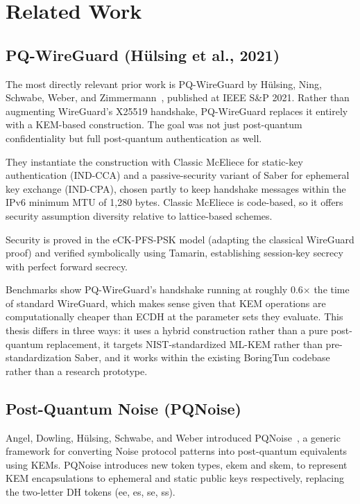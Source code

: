 \chapter{Related Work}
\label{chap:related_work}

\section{PQ-WireGuard (Hülsing et al., 2021)}

The most directly relevant prior work is PQ-WireGuard by Hülsing, Ning, Schwabe, Weber, and Zimmermann~\cite{hulsing2021pqwireguard}, published at IEEE S\&P 2021. Rather than augmenting WireGuard's X25519 handshake, PQ-WireGuard replaces it entirely with a KEM-based construction. The goal was not just post-quantum confidentiality but full post-quantum authentication as well.

They instantiate the construction with Classic McEliece for static-key authentication (IND-CCA) and a passive-security variant of Saber for ephemeral key exchange (IND-CPA), chosen partly to keep handshake messages within the IPv6 minimum MTU of 1,280 bytes. Classic McEliece is code-based, so it offers security assumption diversity relative to lattice-based schemes.

Security is proved in the eCK-PFS-PSK model (adapting the classical WireGuard proof) and verified symbolically using Tamarin, establishing session-key secrecy with perfect forward secrecy.

Benchmarks show PQ-WireGuard's handshake running at roughly 0.6$\times$ the time of standard WireGuard, which makes sense given that KEM operations are computationally cheaper than ECDH at the parameter sets they evaluate. This thesis differs in three ways: it uses a hybrid construction rather than a pure post-quantum replacement, it targets NIST-standardized ML-KEM rather than pre-standardization Saber, and it works within the existing BoringTun codebase rather than a research prototype.

\section{Post-Quantum Noise (PQNoise)}

Angel, Dowling, Hülsing, Schwabe, and Weber introduced PQNoise~\cite{pqnoise2022}, a generic framework for converting Noise protocol patterns into post-quantum equivalents using KEMs. PQNoise introduces new token types, ekem and skem, to represent KEM encapsulations to ephemeral and static public keys respectively, replacing the two-letter DH tokens (ee, es, se, ss).

